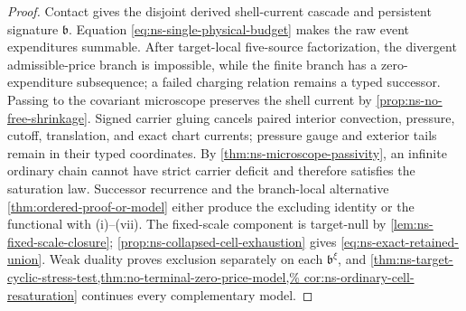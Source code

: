 \documentclass[11pt]{article}
\numberwithin{section}{part}
\theoremstyle{plain}
\theoremstyle{definition}
\theoremstyle{remark}
\begin{document}
\begin{proof}
Contact gives the disjoint derived shell-current cascade and persistent
signature \(\mathfrak b\).  Equation \eqref{eq:ns-single-physical-budget}
makes the raw event expenditures summable.  After target-local five-source
factorization, the divergent admissible-price branch is impossible, while
the finite branch has a zero-expenditure subsequence; a failed charging
relation remains a typed successor.  Passing to the covariant microscope preserves
the shell current by \cref{prop:ns-no-free-shrinkage}.  Signed carrier gluing
cancels paired interior convection, pressure, cutoff, translation, and exact
chart currents; pressure gauge and exterior tails remain in their typed
coordinates.  By \cref{thm:ns-microscope-passivity}, an infinite ordinary
chain cannot have strict carrier deficit and therefore satisfies the
saturation law.  Successor recurrence and the branch-local alternative
\cref{thm:ordered-proof-or-model} either produce the excluding identity or
the functional with
\textup{(i)}--\textup{(vii)}.  The fixed-scale component is target-null by
\cref{lem:ns-fixed-scale-closure};
\cref{prop:ns-collapsed-cell-exhaustion} gives
\eqref{eq:ns-exact-retained-union}.  Weak duality proves exclusion separately
on each \(\mathfrak b^\xi\), and
\cref{thm:ns-target-cyclic-stress-test,thm:no-terminal-zero-price-model,%
cor:ns-ordinary-cell-resaturation}
continues every complementary model.
\end{proof}
\end{document}
